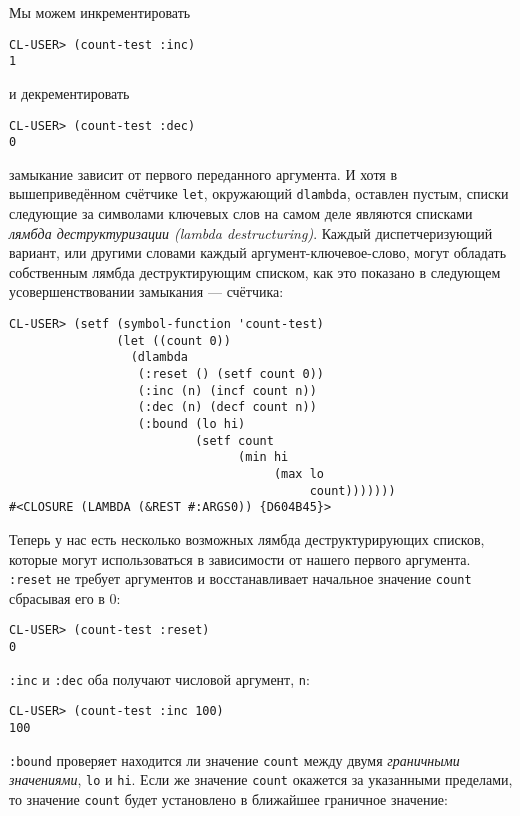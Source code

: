 Мы можем инкрементировать

\begin{verbatim}
CL-USER> (count-test :inc)
1
\end{verbatim}

и декрементировать

\begin{verbatim}
CL-USER> (count-test :dec)
0
\end{verbatim}

замыкание зависит от первого переданного аргумента. И хотя в вышеприведённом счётчике \verb"let", окружающий \verb"dlambda", оставлен пустым, списки следующие за символами ключевых слов на самом деле являются списками \emph{лямбда деструктуризации (lambda destructuring)}. Каждый диспетчеризующий вариант, или другими словами каждый аргумент-ключевое-слово, могут обладать собственным лямбда деструктирующим списком, как это показано в следующем усовершенствовании замыкания --- счётчика:

\begin{verbatim}
CL-USER> (setf (symbol-function 'count-test)
               (let ((count 0))
                 (dlambda
                  (:reset () (setf count 0))
                  (:inc (n) (incf count n))
                  (:dec (n) (decf count n))
                  (:bound (lo hi)
                          (setf count
                                (min hi
                                     (max lo
                                          count)))))))
#<CLOSURE (LAMBDA (&REST #:ARGS0)) {D604B45}>
\end{verbatim}

Теперь у нас есть несколько возможных лямбда деструктурирующих списков, которые могут использоваться в зависимости от нашего первого аргумента. \verb":reset" не требует аргументов и восстанавливает начальное значение \verb"count" сбрасывая его в 0:

\begin{verbatim}
CL-USER> (count-test :reset)
0
\end{verbatim}

\verb":inc" и \verb":dec" оба получают числовой аргумент, \verb"n":

\begin{verbatim}
CL-USER> (count-test :inc 100)
100
\end{verbatim}

\verb":bound" проверяет находится ли значение \verb"count" между двумя \emph{граничными значениями}, \verb"lo" и \verb"hi". Если же значение \verb"count" окажется за указанными пределами, то значение \verb"count" будет установлено в ближайшее граничное значение:

